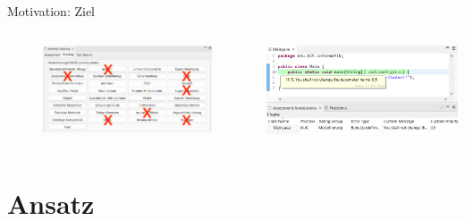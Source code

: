 \documentclass{sdqbeamer}
\begin{document}
\begin{frame}{Motivation: Ziel}
    \begin{columns}
        \begin{column}{0.48\textwidth}
            \begin{figure}
                \includegraphics[scale=0.38]{logos/gradingedition_grading_done.png}
                \caption{\cite{gradingTool}}
                \label{fig:gradingTool}
            \end{figure}
        \end{column}
        \begin{column}{0.48\textwidth}
            \begin{center}
            \includegraphics[scale=0.38]{logos/gradingedition_annotation.png}
            \end{center}
        \end{column}
    \end{columns}
\end{frame}

\section{Ansatz}
\end{document}
